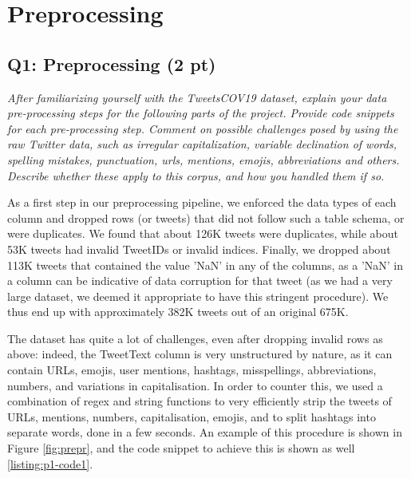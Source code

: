 \section{Preprocessing}

\subsection*{Q1: Preprocessing (2 pt)}
\textit{After familiarizing yourself with the TweetsCOV19 dataset, explain your data pre-processing steps for the following parts of the project. Provide code snippets for each pre-processing step. Comment on possible challenges posed by using the raw Twitter data, such as irregular capitalization, variable declination of words, spelling mistakes, punctuation, urls, mentions, emojis, abbreviations and others. Describe whether these apply to this corpus, and how you handled them if so.}

As a first step in our preprocessing pipeline, we enforced the data types of each column and dropped rows (or tweets) that did not follow such a table schema, or were duplicates. We found that about 126K tweets were duplicates, while about 53K tweets had invalid TweetIDs or invalid indices. Finally, we dropped about 113K tweets that contained the value 'NaN' in any of the columns, as a 'NaN' in a column can be indicative of data corruption for that tweet (as we had a very large dataset, we deemed it appropriate to have this stringent procedure). We thus end up with approximately 382K tweets out of an original 675K.

The dataset has quite a lot of challenges, even after dropping invalid rows as above: indeed, the TweetText column is very unstructured by nature, as it can contain URLs, emojis, user mentions, hashtags, misspellings, abbreviations, numbers, and variations in capitalisation. In order to counter this, we used a combination of regex and string functions to very efficiently strip the tweets of URLs, mentions, numbers, capitalisation, emojis, and to split hashtags into separate words, done in a few seconds. An example of this procedure is shown in Figure \ref{fig:prepr}, and the code snippet to achieve this is shown as well \cref{listing:p1-code1}.


